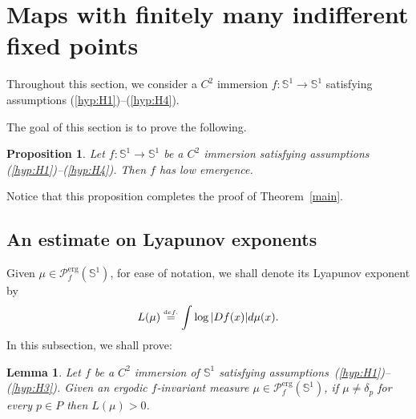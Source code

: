 \documentclass[12pt,a4paper,twoside]{article}
\theoremstyle{plain}
\newtheorem{proposition}[theorem]{Proposition}
\newtheorem{lemma}[theorem]{Lemma}
\theoremstyle{definition}
\newcommand{\cP}{{\mathcal P}}
\newcommand{\eqdef}{\stackrel{\scriptscriptstyle\textrm def.}{=}}
\newcommand{\cps}{\cP_f^{\operatorname{erg}}(\mathbb{S}^1)}
\newcommand{\Sone}{\mathbb{S}^1}
\begin{document}
\section{Maps with finitely many indifferent fixed points}
Throughout this section, we consider a \(C^2\) immersion $f:\Sone\to\Sone$ satisfying assumptions (\ref{hyp:H1})--(\ref{hyp:H4}).

The goal of this section is to prove the following. 

\begin{proposition}\label{prop.lowemergenceunderh1h4}
Let \(f:\Sone\to\Sone\) be a \(C^2\) immersion satisfying assumptions
\emph{(\ref{hyp:H1})--(\ref{hyp:H4})}. Then \(f\) has low emergence.
\end{proposition}

Notice that this proposition completes the proof of Theorem~\ref{main}.


\subsection{An estimate on Lyapunov exponents}

Given $\mu\in\cps$, for ease of notation, we shall denote its Lyapunov exponent by  
\[
L(\mu)\eqdef\int \log|Df(x)|d\mu(x).
\]
In this subsection, we shall prove:

\begin{lemma}
\label{lem:expoentepositivo}
Let $f$ be a $C^2$ immersion of $\mathbb{S}^1$ satisfying assumptions~\emph{(\ref{hyp:H1})--(\ref{hyp:H3})}. Given an ergodic $f$-invariant measure $\mu\in\cP_f^{\operatorname{erg}}(\mathbb{S}^1)$, if $\mu\neq\delta_p$ for every $p\in P$ then $L(\mu)>0$. 
\end{lemma}
\end{document}
